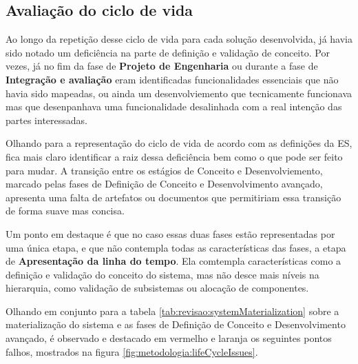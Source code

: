 	\subsection{{\color{blue}Avaliação do ciclo de vida}}

	Ao longo da repetição desse ciclo de vida para cada solução desenvolvida, já havia sido notado um deficiência
	na parte de definição e validação de conceito. Por vezes, já no fim da fase de \textbf{Projeto de Engenharia} ou durante a fase de \textbf{Integração e avaliação}
	eram identificadas funcionalidades essenciais que não havia sido mapeadas, ou ainda um desenvolviemento que tecnicamente funcionava mas que desenpanhava uma 
	funcionalidade desalinhada com a real intenção das partes interessadas.

	Olhando para a representação do ciclo de vida de acordo com as definições da ES, fica mais claro identificar a raiz dessa deficiência bem como o que
	pode ser feito para mudar. A transição entre os estágios de Conceito e Desenvolviemento, marcado pelas fases de Definição de Conceito e Desenvolvimento avançado, apresenta
	uma falta de artefatos ou documentos que permitiriam essa transição de forma suave mas concisa.

	Um ponto em destaque é que no caso essas duas fases estão representadas por uma única etapa, e que não contempla todas as características das fases, a etapa
	de \textbf{Apresentação da linha do tempo}. Ela comtempla características como a definição e validação do conceito do sistema, mas não desce mais níveis na hierarquia,
	como validação de subsistemas ou alocação de componentes.

	Olhando em conjunto para a tabela \ref{tab:revisao:systemMaterialization} sobre a materialização do sistema e as fases de Definição de Conceito e Desenvolvimento avançado,
	é observado e destacado em vermelho e laranja os seguintes pontos falhos, mostrados na figura \ref{fig:metodologia:lifeCycleIssues}.

